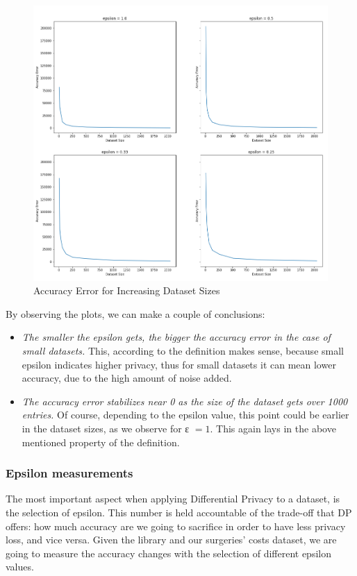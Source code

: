 \begin{figure}[!htb]\centering
    \includegraphics[width=1\textwidth]{images/increasing_ds_size.png}
    \caption{Accuracy Error for Increasing Dataset Sizes}
\end{figure}


By observing the plots, we can make a couple of conclusions:

\begin{itemize}
    \item \emph{The smaller the epsilon gets, the bigger the accuracy error in the case of small datasets.} This, according to the definition makes sense, because small epsilon indicates higher privacy, thus for small datasets it can mean lower accuracy, due to the high amount of noise added.
    \item \emph{The accuracy error stabilizes near 0 as the size of the dataset gets over 1000 entries.} Of course, depending to the epsilon value, this point could be earlier in the dataset sizes, as we observe for ε $= 1$. This again lays in the above mentioned property of the definition.
\end{itemize}

\subsubsection{Epsilon measurements}

The most important aspect when applying Differential Privacy to a dataset, is the selection of epsilon. This number is held accountable of the trade-off that DP offers: how much accuracy are we going to sacrifice in order to have less privacy loss, and vice versa. Given the library and our surgeries' costs dataset, we are going to measure the accuracy changes with the selection of different epsilon values.

